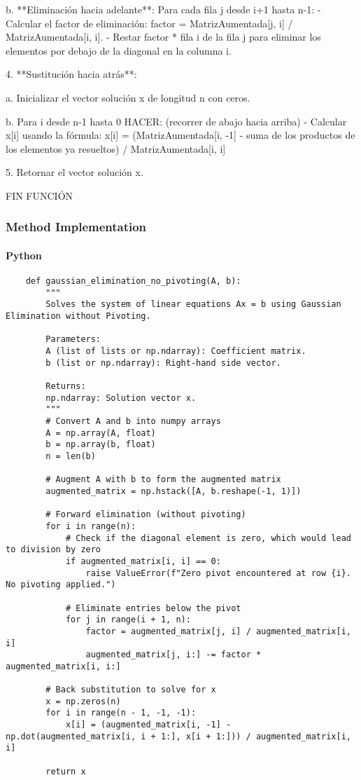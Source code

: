 \documentclass{article}
\begin{document}
        b. **Eliminación hacia adelante**: Para cada fila j desde i+1 hasta n-1:
            - Calcular el factor de eliminación: factor = MatrizAumentada[j, i] / MatrizAumentada[i, i].
            - Restar factor * fila i de la fila j para eliminar los elementos por debajo de la diagonal en la columna i.

    4. **Sustitución hacia atrás**:

        a. Inicializar el vector solución x de longitud n con ceros.

        b. Para i desde n-1 hasta 0 HACER: (recorrer de abajo hacia arriba)
           - Calcular x[i] usando la fórmula:
             x[i] = (MatrizAumentada[i, -1] - suma de los productos de los elementos ya resueltos) / MatrizAumentada[i, i]

    5. Retornar el vector solución x.

FIN FUNCIÓN

        \subsubsection{Method Implementation}
            \paragraph{Python}
                \begin{verbatim}
    def gaussian_elimination_no_pivoting(A, b):
        """
        Solves the system of linear equations Ax = b using Gaussian Elimination without Pivoting.

        Parameters:
        A (list of lists or np.ndarray): Coefficient matrix.
        b (list or np.ndarray): Right-hand side vector.

        Returns:
        np.ndarray: Solution vector x.
        """
        # Convert A and b into numpy arrays
        A = np.array(A, float)
        b = np.array(b, float)
        n = len(b)

        # Augment A with b to form the augmented matrix
        augmented_matrix = np.hstack([A, b.reshape(-1, 1)])

        # Forward elimination (without pivoting)
        for i in range(n):
            # Check if the diagonal element is zero, which would lead to division by zero
            if augmented_matrix[i, i] == 0:
                raise ValueError(f"Zero pivot encountered at row {i}. No pivoting applied.")

            # Eliminate entries below the pivot
            for j in range(i + 1, n):
                factor = augmented_matrix[j, i] / augmented_matrix[i, i]
                augmented_matrix[j, i:] -= factor * augmented_matrix[i, i:]

        # Back substitution to solve for x
        x = np.zeros(n)
        for i in range(n - 1, -1, -1):
            x[i] = (augmented_matrix[i, -1] - np.dot(augmented_matrix[i, i + 1:], x[i + 1:])) / augmented_matrix[i, i]

        return x
                \end{verbatim}
\end{document}
